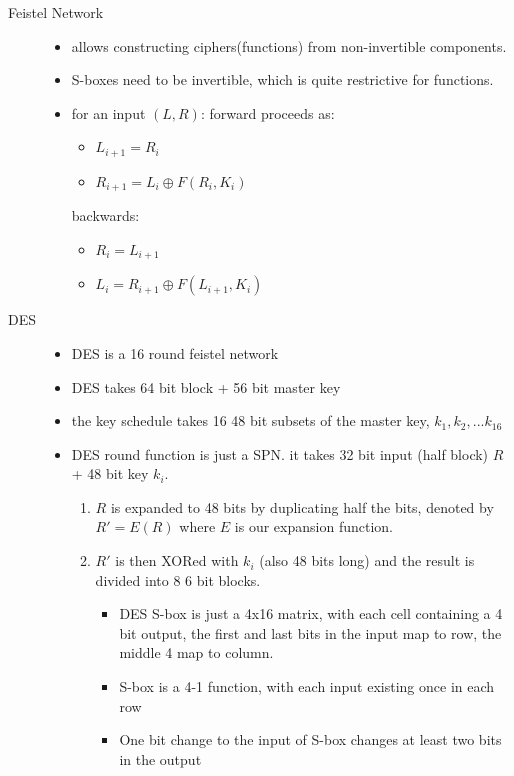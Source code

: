\documentclass[11pt]{article}
\newcommand{\ee}[1]{\ensuremath{#1}}
\begin{document}
\begin{description}
 \item[Feistel Network] \hfill
 \begin{itemize}
 	\item allows constructing ciphers(functions) from non-invertible components.
 	\item S-boxes need to be invertible, which is quite restrictive for functions.
 	\item for an input \ee{(L, R)}:
 	\subitem forward proceeds as:
 	\begin{itemize}
 		\item \ee{L_{i+1} = R_i}
 		\item \ee{R_{i+1} = L_i \oplus F(R_i, K_i)} 		
 	\end{itemize}
 	\subitem backwards:
 	\begin{itemize}
 		\item \ee{R_i = L_{i+1}}
 		\item \ee{L_i = R_{i+1} \oplus F(L_{i+1}, K_i)}
 	\end{itemize}
 	
 \end{itemize}

\newpage
 
\item[DES] \hfill
\begin{itemize}
 	\item DES is a 16 round feistel network
 	\item DES takes 64 bit block + 56 bit master key
 	\item the key schedule takes 16 48 bit subsets of the master key, \ee{k_1, k_2,...k_{16}}
 	\item DES round function is just a SPN. it takes 32 bit input (half block) \ee{R} + 48 bit key \ee{k_i}. \begin{enumerate}
 		\item \ee{R} is expanded to 48 bits by duplicating half the bits, denoted by \ee{R' = E(R)} where \ee{E} is our expansion function.
 		
 		\item \ee{R'} is then XORed with \ee{k_i} (also 48 bits long) and the result is divided into 8 6 bit blocks.
 		\begin{itemize}
 			\item DES S-box is just a 4x16 matrix, with each cell containing a 4 bit output, the first and last bits in the input map to row, the middle 4 map to column. 
 			\item S-box is a 4-1 function, with each input existing once in each row
 			\item One bit change to the input of S-box changes at least two bits in the output
 		\end{itemize}
 	

\end{enumerate}
\end{itemize}
\end{description}
\end{document}
